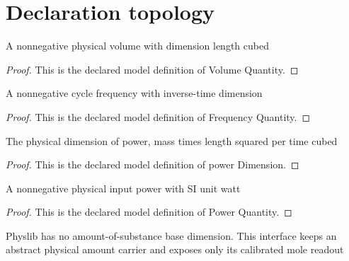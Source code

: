 \section{Declaration topology}
\begin{definition}
  \label{def:physics:phyx-mini-0431:phyxminiproblems-problemphyxmini0431-volumequantity}
  A nonnegative physical volume with dimension length cubed
\end{definition}
\begin{proof}
  This is the declared model definition of Volume Quantity.
\end{proof}
\begin{definition}
  \label{def:physics:phyx-mini-0431:phyxminiproblems-problemphyxmini0431-frequencyquantity}
  A nonnegative cycle frequency with inverse-time dimension
\end{definition}
\begin{proof}
  This is the declared model definition of Frequency Quantity.
\end{proof}
\begin{definition}
  \label{def:physics:phyx-mini-0431:phyxminiproblems-problemphyxmini0431-powerdimension}
  The physical dimension of power, mass times length squared per time cubed
\end{definition}
\begin{proof}
  This is the declared model definition of power Dimension.
\end{proof}
\begin{definition}
  \label{def:physics:phyx-mini-0431:phyxminiproblems-problemphyxmini0431-powerquantity}
  A nonnegative physical input power with SI unit watt
\end{definition}
\begin{proof}
  This is the declared model definition of Power Quantity.
\end{proof}
\begin{definition}
  \label{def:physics:phyx-mini-0431:phyxminiproblems-problemphyxmini0431-amountofsubstancescale}
  Physlib has no amount-of-substance base dimension. This interface keeps an abstract physical amount carrier and exposes only its calibrated mole readout
\end{definition}
